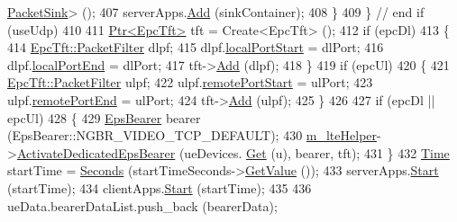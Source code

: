 \begin{DoxyCode}
      \hyperlink{classns3_1_1PacketSink}{PacketSink}> ();
407                       serverApps.\hyperlink{classns3_1_1ApplicationContainer_ad09ab1a1ad5849d518d5f4c262e38152}{Add} (sinkContainer);
408                     \}
409                 \} \textcolor{comment}{// end if (useUdp)}
410 
411               \hyperlink{classns3_1_1Ptr}{Ptr<EpcTft>} tft = Create<EpcTft> ();
412               \textcolor{keywordflow}{if} (epcDl)
413                 \{
414                   \hyperlink{structns3_1_1EpcTft_1_1PacketFilter}{EpcTft::PacketFilter} dlpf;
415                   dlpf.\hyperlink{structns3_1_1EpcTft_1_1PacketFilter_afd505cda437b1687abc4432a8bcefbaf}{localPortStart} = dlPort;
416                   dlpf.\hyperlink{structns3_1_1EpcTft_1_1PacketFilter_a3236947a93fdd516b1d978467eaa0484}{localPortEnd} = dlPort;
417                   tft->\hyperlink{classns3_1_1EpcTft_a1228456a8abbe48cbc89bbe2d2e9af48}{Add} (dlpf);
418                 \}
419               \textcolor{keywordflow}{if} (epcUl)
420                 \{
421                   \hyperlink{structns3_1_1EpcTft_1_1PacketFilter}{EpcTft::PacketFilter} ulpf;
422                   ulpf.\hyperlink{structns3_1_1EpcTft_1_1PacketFilter_aa96ab9356c91b14059220d00155c32b5}{remotePortStart} = ulPort;
423                   ulpf.\hyperlink{structns3_1_1EpcTft_1_1PacketFilter_a4bcdd15a9526e27eabd474276f691cf1}{remotePortEnd} = ulPort;
424                   tft->\hyperlink{classns3_1_1EpcTft_a1228456a8abbe48cbc89bbe2d2e9af48}{Add} (ulpf);
425                 \}
426 
427               \textcolor{keywordflow}{if} (epcDl || epcUl)
428                 \{
429                   \hyperlink{structns3_1_1EpsBearer}{EpsBearer} bearer (EpsBearer::NGBR\_VIDEO\_TCP\_DEFAULT);
430                   \hyperlink{classLteX2HandoverMeasuresTestCase_a5d9f434c242eb81dba2d8e99c43e7046}{m\_lteHelper}->\hyperlink{classns3_1_1LteHelper_af28041edd4c96bde1a2e07c90e363dcc}{ActivateDedicatedEpsBearer} (ueDevices.
      \hyperlink{classns3_1_1NetDeviceContainer_a677d62594b5c9d2dea155cc5045f4d0b}{Get} (u), bearer, tft);
431                 \}
432               \hyperlink{classns3_1_1Time}{Time} startTime = \hyperlink{group__timecivil_ga33c34b816f8ff6628e33d5c8e9713b9e}{Seconds} (startTimeSeconds->\hyperlink{classns3_1_1UniformRandomVariable_a03822d8c86ac51e9aa83bbc73041386b}{GetValue} ());
433               serverApps.\hyperlink{classns3_1_1ApplicationContainer_a8eff87926507020bbe3e1390358a54a7}{Start} (startTime);
434               clientApps.\hyperlink{classns3_1_1ApplicationContainer_a8eff87926507020bbe3e1390358a54a7}{Start} (startTime);
435 
436               ueData.bearerDataList.push\_back (bearerData);

\end{DoxyCode}
